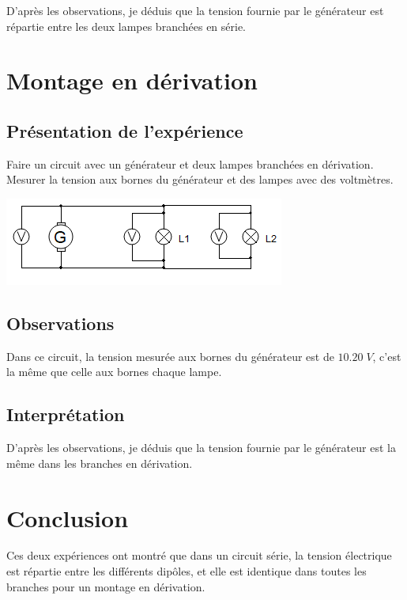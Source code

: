 \documentclass[12pt,a4paper]{article}
\begin{document}
D'après les observations, je déduis que la tension fournie par le générateur est répartie entre les deux lampes branchées en série.

\section{Montage en dérivation}

\subsection{Présentation de l'expérience}


Faire un circuit avec un générateur et deux lampes branchées en dérivation. Mesurer la tension aux bornes du générateur et des lampes avec des voltmètres.

\begin{center}
	\includegraphics[scale=0.9]{img/schema_drv}
\end{center}


\subsection{Observations}

Dans ce circuit, la tension mesurée aux bornes du générateur est de $\num{10.20} \; V$, c'est la même que celle aux bornes chaque lampe.

\subsection{Interprétation}

D'après les observations, je déduis que la tension fournie par le générateur est la même dans les branches en dérivation.

\section{Conclusion}

Ces deux expériences ont montré que dans un circuit série, la tension électrique est répartie entre les différents dipôles, et elle est identique dans toutes les branches pour un montage en dérivation.
\end{document}
